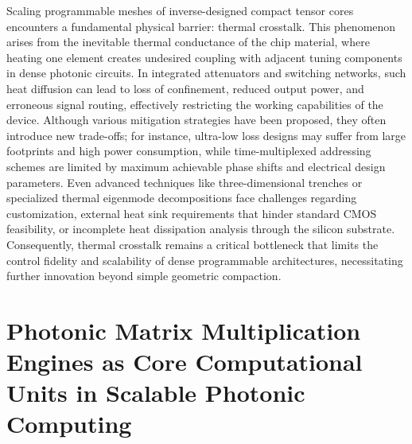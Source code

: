 Scaling programmable meshes of inverse-designed compact tensor cores encounters a fundamental physical barrier: thermal crosstalk. \citep{doi_10_1109_access_2020_3013116_8fec1fb2} This phenomenon arises from the inevitable thermal conductance of the chip material, where heating one element creates undesired coupling with adjacent tuning components in dense photonic circuits. In integrated attenuators and switching networks, such heat diffusion can lead to loss of confinement, reduced output power, and erroneous signal routing, effectively restricting the working capabilities of the device. Although various mitigation strategies have been proposed, they often introduce new trade-offs; for instance, ultra-low loss designs may suffer from large footprints and high power consumption, while time-multiplexed addressing schemes are limited by maximum achievable phase shifts and electrical design parameters. Even advanced techniques like three-dimensional trenches or specialized thermal eigenmode decompositions face challenges regarding customization, external heat sink requirements that hinder standard CMOS feasibility, or incomplete heat dissipation analysis through the silicon substrate. Consequently, thermal crosstalk remains a critical bottleneck that limits the control fidelity and scalability of dense programmable architectures, necessitating further innovation beyond simple geometric compaction. \citep{doi_10_1109_access_2020_3013116_8fec1fb2}

\section{Photonic Matrix Multiplication Engines as Core Computational Units in Scalable Photonic Computing}\label{photonic-matrix-multiplication-engines-as-core-computational-units-in-scalable-photonic-computing}

